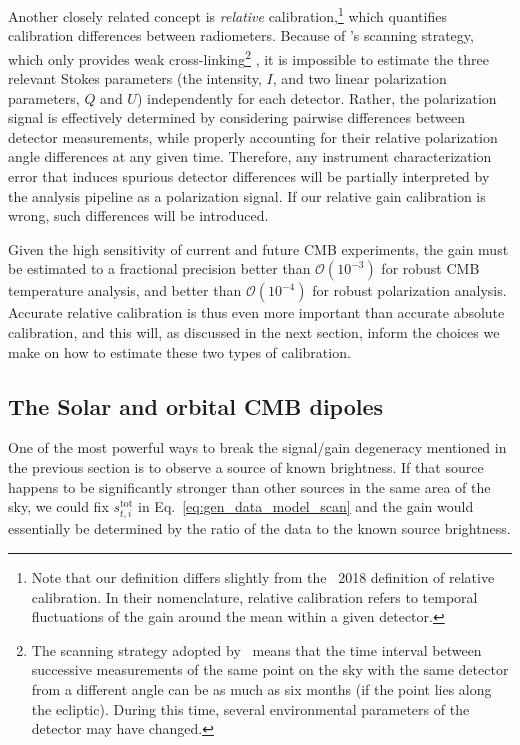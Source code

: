 \documentclass[twocolumn]{aa}
\newcommand{\ti}[0]{_{t, i}}
\newcommand{\tot}[0]{^{\mathrm{tot}}}
\begin{document}
Another closely related concept is \emph{relative} calibration,\footnote{Note that our definition differs slightly from the \Planck\ 2018 definition of relative calibration. In their nomenclature, relative calibration refers to temporal fluctuations of the gain around the mean within a given detector.} which quantifies calibration differences between radiometers. Because of \Planck 's scanning strategy, which only provides weak cross-linking\footnote{The scanning strategy adopted by \Planck\ means that the time interval between successive measurements of the same point on the sky with the same detector from a different angle can be as much as six months (if the point lies along the ecliptic). During this time, several environmental parameters of the detector may have changed.} \citep{planck2011-1.1}, it is impossible to estimate the three relevant Stokes parameters (the intensity, $I$, and two linear polarization parameters, $Q$ and $U$) independently for each detector. Rather, the polarization signal is effectively determined by considering pairwise differences between detector measurements, while properly accounting for their relative polarization angle differences at any given time. Therefore, any instrument characterization error that induces spurious detector differences will be partially interpreted by the analysis pipeline as a polarization signal. If our relative gain calibration is wrong, such differences will be introduced.

Given the high sensitivity of current and future CMB experiments, the gain must be estimated to a fractional precision better than $\mathcal{O}(10^{-3})$ for robust CMB temperature analysis, and better than $\mathcal{O}(10^{-4})$ for robust polarization analysis. Accurate relative calibration is thus even more important than accurate absolute calibration, and this will, as discussed in the next section, inform the choices we make on how to estimate these two types of calibration.

\subsection{The Solar and orbital CMB dipoles}
\label{sec:dipoles}
One of the most powerful ways to break the signal/gain degeneracy mentioned in the previous section is to observe a source of known brightness. If that source happens to be significantly stronger than other sources in the same area of the sky, we could fix $s\ti\tot$ in Eq.~\eqref{eq:gen_data_model_scan} and the gain would essentially be determined by the ratio of the data to the known source brightness. 
\end{document}
